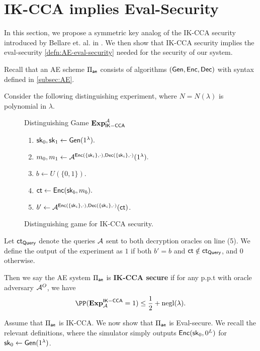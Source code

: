 \section{IK-CCA implies Eval-Security}
\label{sec:IND-CCPKA}
In this section, we propose a symmetric key analog of the IK-CCA security introduced by Bellare et. al. in \cite[Definition 1]{BBDP01keyprivate}.
We then show that IK-CCA security implies the eval-security \cref{defn:AE-eval-security} needed for the security of our system.

Recall that an AE scheme $\Pi_{\mathsf{ae}}$ consists of algorithms $(\mathsf{Gen}, \mathsf{Enc}, \mathsf{Dec})$ with syntax defined in \cref{subsec:AE}. 

\begin{definition}[IK-CCA]
\label{defn:AE-IK-CCA}
Consider the following distinguishing experiment, where $N = N(\lambda)$ is polynomial in $\lambda$.
\begin{figure}[ht!]
\begin{framed}
Distinguishing Game $\mathbf{Exp}_{\mathsf{IK-CCA}}^{\mathcal{A}}$
\begin{enumerate}
    \item ${\mathsf{sk}}_0, {\mathsf{sk}}_1 \leftarrow \mathsf{Gen}(1^{\lambda}).$
    \item $m_0, m_1 \leftarrow \mathcal{A}^{\mathsf{Enc}(\{{\mathsf{sk}}_{i}\}, \cdot), \mathsf{Dec}(\{{\mathsf{sk}}_{i}\}, \cdot)}(1^{\lambda}).$
    \item $b \leftarrow U(\{0, 1\})$.
    \item $\mathsf{ct} \leftarrow \mathsf{Enc}({\mathsf{sk}}_b, m_b).$
    \item $b' \leftarrow \mathcal{A}^{\mathsf{Enc}(\{{\mathsf{sk}}_{i}\}, \cdot), \mathsf{Dec}(\{{\mathsf{sk}}_{i}\}, \cdot)}(\mathsf{ct})$.
\end{enumerate}
\end{framed}
\caption{Distinguishing game for IK-CCA security.}
\label{expr:AE-IKCCA-Distinguish}
\end{figure}

Let $\mathsf{ct}_{\mathsf{Query}}$ denote the queries $\mathcal{A}$ sent to both decryption oracles on line (5).  We define the output of the experiment as $1$ if both $b' = b$ and $\mathsf{ct} \notin \mathsf{ct}_{\mathsf{Query}}$, and $0$ otherwise. 

Then we say the AE system $\Pi_{\mathsf{ae}}$ is \textbf{IK-CCA secure} if for any p.p.t with oracle adversary $\mathcal{A}^O$, we have
$$\PP(\mathbf{Exp}^{\mathsf{IK-CCA}}_{\cA} = 1) \leq \frac{1}{2} + \negl(\lambda).$$
\end{definition}

Assume that $\Pi_{\mathsf{ae}}$ is IK-CCA. We now show that $\Pi_{\mathsf{ae}}$ is Eval-secure. We recall the relevant definitions, where the simulator simply outputs $\mathsf{Enc}({\mathsf{sk}}_{0}, 0^{L})$ for ${\mathsf{sk}}_0 \leftarrow \mathsf{Gen}(1^{\lambda})$.

